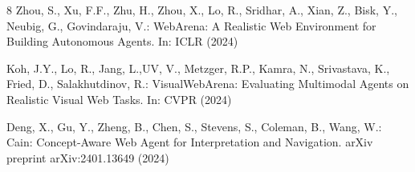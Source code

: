 \documentclass[runningheads]{llncs}
\begin{document}

\begin{thebibliography}{8}
Zhou, S., Xu, F.F., Zhu, H., Zhou, X., Lo, R., Sridhar, A., Xian, Z., Bisk, Y., Neubig, G., Govindaraju, V.: WebArena: A Realistic Web Environment for Building Autonomous Agents. In: ICLR (2024)

Koh, J.Y., Lo, R., Jang, L.,UV, V., Metzger, R.P., Kamra, N., Srivastava, K., Fried, D., Salakhutdinov, R.: VisualWebArena: Evaluating Multimodal Agents on Realistic Visual Web Tasks. In: CVPR (2024)

Deng, X., Gu, Y., Zheng, B., Chen, S., Stevens, S., Coleman, B., Wang, W.: Cain: Concept-Aware Web Agent for Interpretation and Navigation. arXiv preprint arXiv:2401.13649 (2024)

\end{thebibliography}
\end{document}
